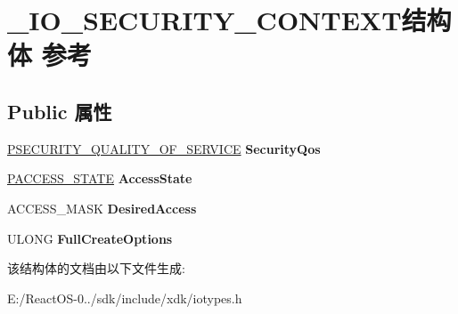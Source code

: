 \hypertarget{struct___i_o___s_e_c_u_r_i_t_y___c_o_n_t_e_x_t}{}\section{\+\_\+\+I\+O\+\_\+\+S\+E\+C\+U\+R\+I\+T\+Y\+\_\+\+C\+O\+N\+T\+E\+X\+T结构体 参考}
\label{struct___i_o___s_e_c_u_r_i_t_y___c_o_n_t_e_x_t}
\subsection*{Public 属性}
\begin{DoxyCompactItemize}
\item 
\mbox{\label{struct___i_o___s_e_c_u_r_i_t_y___c_o_n_t_e_x_t_a96eb476fbb6c0aa13b347f4e44711a36}} 
\hyperlink{struct___s_e_c_u_r_i_t_y___q_u_a_l_i_t_y___o_f___s_e_r_v_i_c_e}{P\+S\+E\+C\+U\+R\+I\+T\+Y\+\_\+\+Q\+U\+A\+L\+I\+T\+Y\+\_\+\+O\+F\+\_\+\+S\+E\+R\+V\+I\+CE} {\bfseries Security\+Qos}
\item 
\mbox{\label{struct___i_o___s_e_c_u_r_i_t_y___c_o_n_t_e_x_t_a4a71133f8dcbf8e4a0ae8d707af6af6a}} 
\hyperlink{struct___a_c_c_e_s_s___s_t_a_t_e}{P\+A\+C\+C\+E\+S\+S\+\_\+\+S\+T\+A\+TE} {\bfseries Access\+State}
\item 
\mbox{\label{struct___i_o___s_e_c_u_r_i_t_y___c_o_n_t_e_x_t_ac7740d48c39152a386497309d8349b21}} 
A\+C\+C\+E\+S\+S\+\_\+\+M\+A\+SK {\bfseries Desired\+Access}
\item 
\mbox{\label{struct___i_o___s_e_c_u_r_i_t_y___c_o_n_t_e_x_t_acfaa915133d0e3babef214d5e0eec9ad}} 
U\+L\+O\+NG {\bfseries Full\+Create\+Options}
\end{DoxyCompactItemize}


该结构体的文档由以下文件生成\+:\begin{DoxyCompactItemize}
\item 
E\+:/\+React\+O\+S-\/0../sdk/include/xdk/iotypes.\+h\end{DoxyCompactItemize}
